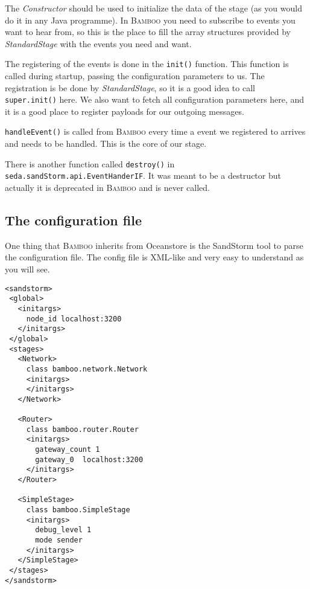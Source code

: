 \documentclass[twocolumn, twoside, a4paper]{article}
\begin{document}
The \emph{Constructor} should be used to initialize the data of the stage (as
you would do it in any Java programme). In \textsc{Bamboo} you need to subscribe
to events you want to hear from, so this is the place to fill the array
structures provided by \emph{StandardStage} with the events you need
and want.

The registering of the events is done in the \texttt{init()} function. This
function is called during startup, passing the configuration parameters
to us. The registration is be done by \emph{StandardStage}, so it is a
good idea to call \texttt{super.init()} here. We also want to fetch all
configuration parameters here, and it is a good place to register
payloads for our outgoing messages. 

\texttt{handleEvent()} is called from \textsc{Bamboo} every time a event we
registered to arrives and needs to be handled. This is the core of
our stage.

There is another function called \texttt{destroy()} in
\texttt{seda.sandStorm.api.EventHanderIF}. It was meant to be a
destructor but actually it is deprecated in \textsc{Bamboo} and is never
called.


\subsection{The configuration file}
\label{sec:config}

One thing that \textsc{Bamboo} inherits from Ocean\-store is the Sand\-Storm
tool to parse the configuration file. The config file is XML-like and
very easy to understand as you will see.


\lstset{language=XML, tabsize=2, numbers=left, numberstyle=\tiny,
  stepnumber=2, numbersep=0pt, aboveskip=20pt, belowskip=20pt,
  xleftmargin=10pt}
\begin{lstlisting}[caption={Our \textsc{Bamboo} config file: simple.cfg},
  label=config]
<sandstorm> 
 <global>
   <initargs>
     node_id localhost:3200
   </initargs>
 </global>
 <stages>
   <Network>
     class bamboo.network.Network
     <initargs>
     </initargs>
   </Network>

   <Router>
     class bamboo.router.Router
     <initargs>
       gateway_count 1
       gateway_0  localhost:3200
     </initargs>
   </Router>

   <SimpleStage>
     class bamboo.SimpleStage
     <initargs>
       debug_level 1
       mode sender
     </initargs>
   </SimpleStage>
 </stages>
</sandstorm>
\end{lstlisting}
\end{document}

